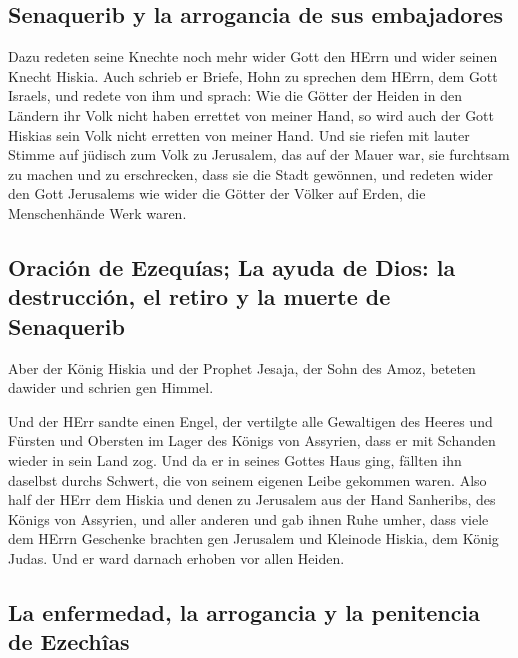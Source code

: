 \hypertarget{senaquerib-y-la-arrogancia-de-sus-embajadores}{%
\subsection{Senaquerib y la arrogancia de sus
embajadores}\label{senaquerib-y-la-arrogancia-de-sus-embajadores}}

 Dazu redeten seine Knechte noch mehr wider Gott den
HErrn und wider seinen Knecht Hiskia.  Auch schrieb er
Briefe, Hohn zu sprechen dem HErrn, dem Gott Israels, und redete von ihm
und sprach: Wie die Götter der Heiden in den Ländern ihr Volk nicht
haben errettet von meiner Hand, so wird auch der Gott Hiskias sein Volk
nicht erretten von meiner Hand.  Und sie riefen mit
lauter Stimme auf jüdisch zum Volk zu Jerusalem, das auf der Mauer war,
sie furchtsam zu machen und zu erschrecken, dass sie die Stadt gewönnen,
 und redeten wider den Gott Jerusalems wie wider die
Götter der Völker auf Erden, die Menschenhände Werk waren.

\hypertarget{oraciuxf3n-de-ezequuxedas-la-ayuda-de-dios-la-destrucciuxf3n-el-retiro-y-la-muerte-de-senaquerib}{%
\subsection{Oración de Ezequías; La ayuda de Dios: la destrucción, el
retiro y la muerte de
Senaquerib}\label{oraciuxf3n-de-ezequuxedas-la-ayuda-de-dios-la-destrucciuxf3n-el-retiro-y-la-muerte-de-senaquerib}}

 Aber der König Hiskia und der Prophet Jesaja, der Sohn
des Amoz, beteten dawider und schrien gen Himmel.

 Und der HErr sandte einen Engel, der vertilgte alle
Gewaltigen des Heeres und Fürsten und Obersten im Lager des Königs von
Assyrien, dass er mit Schanden wieder in sein Land zog. Und da er in
seines Gottes Haus ging, fällten ihn daselbst durchs Schwert, die von
seinem eigenen Leibe gekommen waren.  Also half der HErr
dem Hiskia und denen zu Jerusalem aus der Hand Sanheribs, des Königs von
Assyrien, und aller anderen und gab ihnen Ruhe umher, 
dass viele dem HErrn Geschenke brachten gen Jerusalem und Kleinode
Hiskia, dem König Judas. Und er ward darnach erhoben vor allen Heiden.

\hypertarget{la-enfermedad-la-arrogancia-y-la-penitencia-de-ezechuxeeas}{%
\subsection{La enfermedad, la arrogancia y la penitencia de
Ezechîas}\label{la-enfermedad-la-arrogancia-y-la-penitencia-de-ezechuxeeas}}


